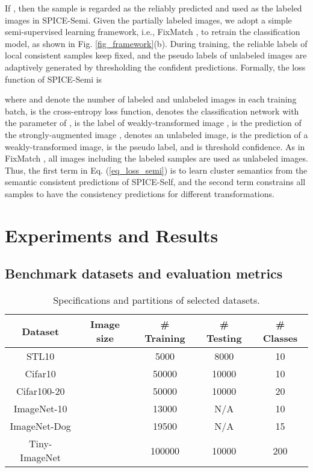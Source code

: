 \documentclass[10pt,twocolumn,letterpaper]{article}
\begin{document}
If , then the sample  is regarded as the reliably predicted and used as the labeled images in SPICE-Semi. Given the partially labeled images, we adopt a simple semi-supervised learning framework, i.e., FixMatch \cite{fixmatch}, to retrain the classification model, as shown in Fig. \ref{fig_framework}(b).
During training, the reliable labels of local consistent samples keep fixed, and the pseudo labels of unlabeled images are adaptively generated by thresholding the confident predictions.
Formally, the loss function of SPICE-Semi is

where  and  denote the number of labeled and unlabeled images in each training batch,  is the cross-entropy loss function,  denotes the classification network with the parameter of ,  is the label of weakly-transformed image ,  is the prediction of the strongly-augmented image ,  denotes an unlabeled image,  is the prediction of a weakly-transformed image,  is the pseudo label, and  is threshold confidence. As in FixMatch \cite{fixmatch}, all images including the labeled samples are used as unlabeled images. Thus, the first term in Eq. (\ref{eq_loss_semi}) is to learn cluster semantics from the semantic consistent predictions of SPICE-Self, and the second term constrains all samples to have the consistency predictions for different transformations.

\section{Experiments and Results}

\subsection{Benchmark datasets and evaluation metrics}

\begin{table}[ht]
\footnotesize
\caption{Specifications and partitions of selected datasets.}
\label{table_data}
\centering
\begin{tabular}{|c|cccc|}
\hline
Dataset & Image size & \# Training & \# Testing & \# Classes \\
\hline\hline
STL10         &    & 5000      & 8000   &  10   \\
Cifar10       &    & 50000     & 10000  &  10   \\
Cifar100-20   &    & 50000     & 10000  &  20   \\
ImageNet-10   &   & 13000     & N/A    &  10   \\
ImageNet-Dog  &   & 19500     & N/A    &  15   \\
Tiny-ImageNet &    & 100000    & 10000  &  200  \\
\hline

\end{tabular}
\end{table}
\end{document}
